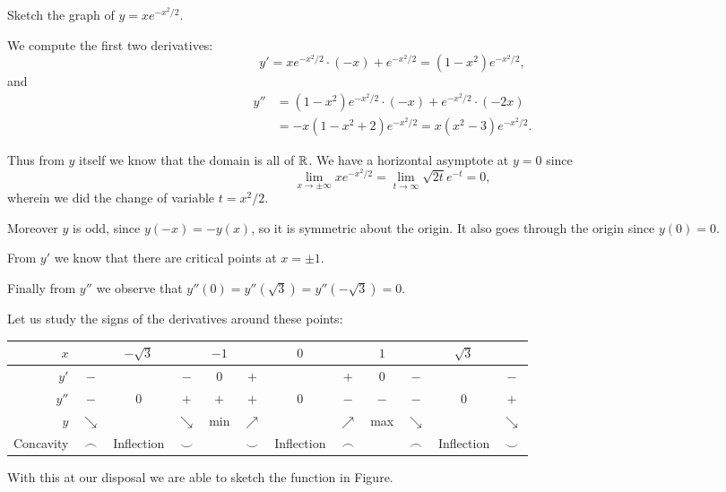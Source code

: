 \begin{example}
	Sketch the graph of $y = x e^{-x^2 / 2}$.

	We compute the first two derivatives:
	\[
		y' = x e^{-x^2 / 2} \cdot (-x) + e^{-x^2 / 2} = (1 - x^2) e^{-x^2 / 2},
	\]
	and
	\begin{align*}
		y'' & = (1 - x^2) e^{-x^2 / 2} \cdot (-x) + e^{-x^2 / 2} \cdot (-2x) \\
		    & = -x (1 - x^2 + 2) e^{-x^2 / 2} = x (x^2 - 3) e^{-x^2 / 2}.
	\end{align*}

	\noindent
	Thus from $y$ itself we know that the domain is all of $\mathbb{R}$. We have a horizontal asymptote at $y = 0$ since
	\[
		\lim_{x \to \pm \infty} x e^{- x^2 / 2} = \lim_{t \to \infty} \sqrt{2t} e^{-t} = 0,
	\]
	wherein we did the change of variable $t = x^2 / 2$.

	Moreover $y$ is odd, since $y(-x) = -y(x)$, so it is symmetric about the origin. It also goes through the origin since $y(0) = 0$.

	From $y'$ we know that there are critical points at $x = \pm 1$.

	Finally from $y''$ we observe that $y''(0) = y''(\sqrt{3}) = y''(-\sqrt{3}) = 0$.

	Let us study the signs of the derivatives around these points:

	\bigskip

	\begin{adjustbox}{center}
		\begin{tabular}{r | *{11}{c}}
			$x$       &            & $-\sqrt{3}$ &            & $-1$ &            & $0$        &            & $1$ &            & $\sqrt{3}$ &            \\ \hline
			$y'$      & $-$        &             & $-$        & $0$  & $+$        &            & $+$        & $0$ & $-$        &            & $-$        \\
			$y''$     & $-$        & $0$         & $+$        & $+$  & $+$        & $0$        & $-$        & $-$ & $-$        & $0$        & $+$        \\
			$y$       & $\searrow$ &             & $\searrow$ & min  & $\nearrow$ &            & $\nearrow$ & max & $\searrow$ &            & $\searrow$ \\
			Concavity & $\frown$   & Inflection  & $\smile$   &      & $\smile$   & Inflection & $\frown$   &     & $\frown$   & Inflection & $\smile$
		\end{tabular}
	\end{adjustbox}

	\noindent
	With this at our disposal we are able to sketch the function in Figure.
\end{example}

